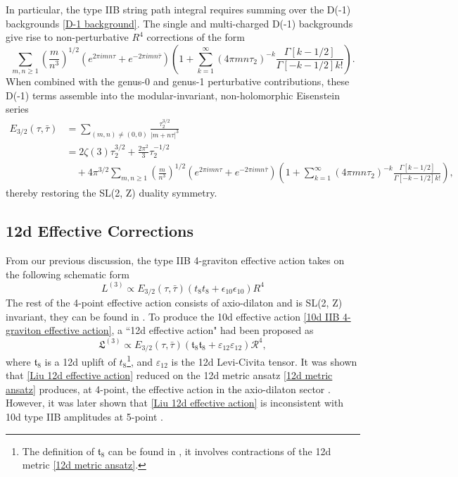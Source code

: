 In particular, the type IIB string path integral requires summing over the D(-1) backgrounds \eqref{D-1 background}.
The single and multi-charged D(-1) backgrounds give rise to non-perturbative $R^4$ corrections \cite{Green:1997tv,Kehagias:1997cq} of the form
\begin{equation}
\sum_{m,n\ge1}\left(\frac{m}{n^3}\right)^{1/2}
(e^{2\pi i mn\tau}+e^{-2\pi i mn\bar{\tau}})
\left(
1+\sum_{k=1}^\infty(4\pi mn\tau_2)^{-k}\frac{\Gamma[k-1/2]}{\Gamma[-k-1/2]k!}
\right).
\end{equation}
When combined with the genus-0 and genus-1 perturbative contributions, these D(-1) terms assemble into the modular-invariant, non-holomorphic Eisenstein series
\begin{equation}
\begin{aligned}
E_{3/2}(\tau,\bar\tau)
&=\sum_{(m,n)\neq(0,0)}\frac{\tau_2^{3/2}}{|m+n\tau|^3}\\
&=2\zeta(3)\tau_2^{3/2}+\frac{2\pi^2}{3}\tau_2^{-1/2}\\
&\quad+4\pi^{3/2}\sum_{m,n\ge1}\left(\frac{m}{n^3}\right)^{1/2}
(e^{2\pi i mn\tau}+e^{-2\pi i mn\bar{\tau}})
\left(
1+\sum_{k=1}^\infty(4\pi mn\tau_2)^{-k}\frac{\Gamma[k-1/2]}{\Gamma[-k-1/2]k!}
\right),
\end{aligned}
\end{equation}
thereby restoring the SL(2, Z) duality symmetry.

\subsection{12d Effective Corrections}
From our previous discussion, the type IIB 4-graviton effective action takes on the following schematic form \cite{Kehagias:1997cq,Green:1997tv}
\begin{equation}
L^{(3)} \propto E_{3/2}(\tau,\bar\tau)(t_8t_8 + \epsilon_{10}\epsilon_{10})R^4
\label{10d IIB 4-graviton effective action}
\end{equation}
The rest of the 4-point effective action consists of axio-dilaton and is SL(2, Z) invariant, they can be found in \cite{Policastro:2006vt,Policastro:2008hg}.
To produce the 10d effective action \eqref{10d IIB 4-graviton effective action},
a ``12d effective action" had been proposed as \cite{Minasian:2015bxa} 
\begin{equation}
\mathfrak{L}^{(3)} \propto E_{3/2}(\tau,\bar\tau)(\mathfrak{t}_8\mathfrak{t}_8 +{\varepsilon}_{12}{\varepsilon}_{12})\mathcal{R}^4,
\label{Liu 12d effective action}
\end{equation}
where $\mathfrak{t}_8$ is a 12d uplift of $t_8$\footnote{
The definition of $\mathfrak{t_8}$ can be found in \cite{Minasian:2015bxa}, it involves contractions of the 12d metric \eqref{12d metric ansatz}.},
and $\varepsilon_{12}$ is the 12d Levi-Civita tensor.
It was shown that \eqref{Liu 12d effective action} reduced on the 12d metric ansatz \eqref{12d metric ansatz} produces, at 4-point, the effective action in the axio-dilaton sector \cite{Policastro:2006vt,Policastro:2008hg}.
However, it was later shown that \eqref{Liu 12d effective action} is inconsistent with 10d type IIB amplitudes at 5-point \cite{Liu:2025uqu}.

